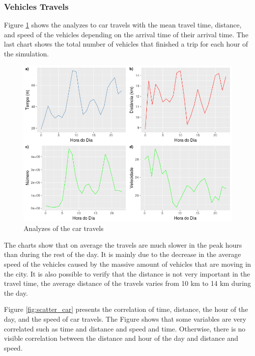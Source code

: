 \subsubsection{Vehicles Travels}

Figure \ref{fig:travel_time2} shows the analyzes to car travels with the mean travel time, distance, and speed of the vehicles depending on the arrival time of their arrival time. The last chart shows the total number of vehicles that finished a trip for each hour of the simulation.

\begin{figure}[!htb]
\centering
\includegraphics[width=1\textwidth]{figuras/chap-sp/time_distance_car.png}
\caption{Analyzes of the car travels}
\label{fig:travel_time2}
\end{figure}

The charts show that on average the travels are much slower in the peak hours than during the rest of the day. It is mainly due to the decrease in the average speed of the vehicles caused by the massive amount of vehicles that are moving in the city. It is also possible to verify that the distance is not very important in the travel time, the average distance of the travels varies from 10 km to 14 km during the day.

Figure \ref{fig:scatter_car} presents the correlation of time, distance, the hour of the day, and the speed of car travels. The Figure shows that some variables are very correlated such as time and distance and speed and time. Otherwise, there is no visible correlation between the distance and hour of the day and distance and speed.

